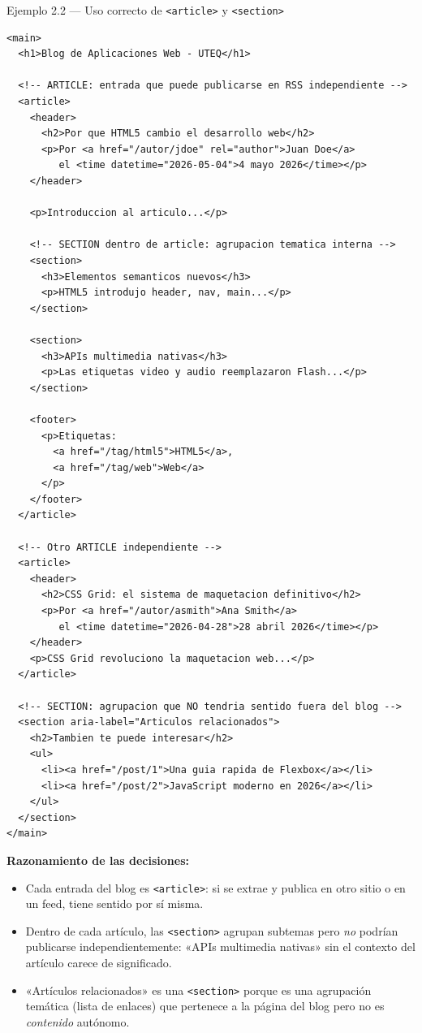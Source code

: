 \documentclass[11pt,a4paper,openany]{book}
\begin{document}
\begin{cajaejemplo}{Ejemplo 2.2 --- Uso correcto de \texttt{<article>} y \texttt{<section>}}
\begin{lstlisting}[style=html,caption={blog.html (extracto significativo)},label=lst:2.5]
<main>
  <h1>Blog de Aplicaciones Web - UTEQ</h1>

  <!-- ARTICLE: entrada que puede publicarse en RSS independiente -->
  <article>
    <header>
      <h2>Por que HTML5 cambio el desarrollo web</h2>
      <p>Por <a href="/autor/jdoe" rel="author">Juan Doe</a>
         el <time datetime="2026-05-04">4 mayo 2026</time></p>
    </header>

    <p>Introduccion al articulo...</p>

    <!-- SECTION dentro de article: agrupacion tematica interna -->
    <section>
      <h3>Elementos semanticos nuevos</h3>
      <p>HTML5 introdujo header, nav, main...</p>
    </section>

    <section>
      <h3>APIs multimedia nativas</h3>
      <p>Las etiquetas video y audio reemplazaron Flash...</p>
    </section>

    <footer>
      <p>Etiquetas:
        <a href="/tag/html5">HTML5</a>,
        <a href="/tag/web">Web</a>
      </p>
    </footer>
  </article>

  <!-- Otro ARTICLE independiente -->
  <article>
    <header>
      <h2>CSS Grid: el sistema de maquetacion definitivo</h2>
      <p>Por <a href="/autor/asmith">Ana Smith</a>
         el <time datetime="2026-04-28">28 abril 2026</time></p>
    </header>
    <p>CSS Grid revoluciono la maquetacion web...</p>
  </article>

  <!-- SECTION: agrupacion que NO tendria sentido fuera del blog -->
  <section aria-label="Articulos relacionados">
    <h2>Tambien te puede interesar</h2>
    <ul>
      <li><a href="/post/1">Una guia rapida de Flexbox</a></li>
      <li><a href="/post/2">JavaScript moderno en 2026</a></li>
    </ul>
  </section>
</main>
\end{lstlisting}

\textbf{Razonamiento de las decisiones:}
\begin{itemize}
\item Cada entrada del blog es \texttt{<article>}: si se extrae y
publica en otro sitio o en un feed, tiene sentido por sí misma.
\item Dentro de cada artículo, las \texttt{<section>} agrupan
subtemas pero \emph{no} podrían publicarse independientemente: «APIs
multimedia nativas» sin el contexto del artículo carece de
significado.
\item «Artículos relacionados» es una \texttt{<section>} porque es
una agrupación temática (lista de enlaces) que pertenece a la página
del blog pero no es \emph{contenido} autónomo.
\end{itemize}
\end{cajaejemplo}
\end{document}
